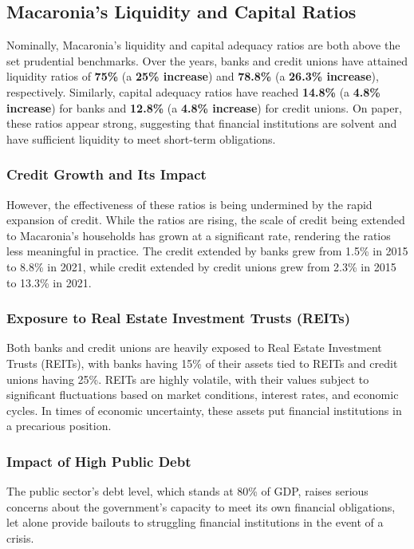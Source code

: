 
\subsection*{Macaronia's Liquidity and Capital Ratios}

Nominally, Macaronia's liquidity and capital adequacy ratios are both above the set prudential benchmarks. Over the years, banks and credit unions have attained liquidity ratios of \textbf{75\%} (a \textbf{25\% increase}) and \textbf{78.8\%} (a \textbf{26.3\% increase}), respectively. Similarly, capital adequacy ratios have reached \textbf{14.8\%} (a \textbf{4.8\% increase}) for banks and \textbf{12.8\%} (a \textbf{4.8\% increase}) for credit unions. On paper, these ratios appear strong, suggesting that financial institutions are solvent and have sufficient liquidity to meet short-term obligations.

\subsubsection{Credit Growth and Its Impact}
However, the effectiveness of these ratios is being undermined by the rapid expansion of credit. While the ratios are rising, the scale of credit being extended to Macaronia's households has grown at a significant rate, rendering the ratios less meaningful in practice. The credit extended by banks grew from 1.5\% in 2015 to 8.8\% in 2021, while credit extended by credit unions grew from 2.3\% in 2015 to 13.3\% in 2021. 

\subsubsection{Exposure to Real Estate Investment Trusts (REITs)}
Both banks and credit unions are heavily exposed to Real Estate Investment Trusts (REITs), with banks having 15\% of their assets tied to REITs and credit unions having 25\%. REITs are highly volatile, with their values subject to significant fluctuations based on market conditions, interest rates, and economic cycles. In times of economic uncertainty, these assets put financial institutions in a precarious position.

\subsubsection{Impact of High Public Debt}
The public sector's debt level, which stands at 80\% of GDP, raises serious concerns about the government's capacity to meet its own financial obligations, let alone provide bailouts to struggling financial institutions in the event of a crisis.

